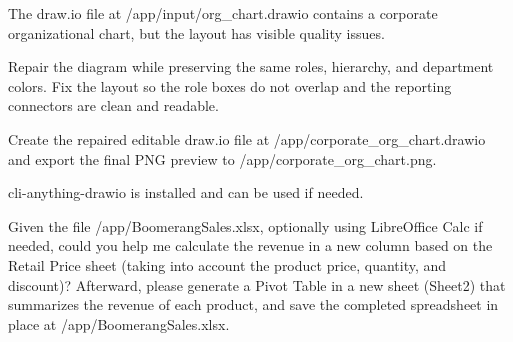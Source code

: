\begin{instructionbox}
The draw.io file at \textasciigrave{}/app/input/org\_chart.drawio\textasciigrave{} contains a corporate organizational chart, but the layout has visible quality issues.

Repair the diagram while preserving the same roles, hierarchy, and department colors. Fix the layout so the role boxes do not overlap and the reporting connectors are clean and readable.

Create the repaired editable draw.io file at \textasciigrave{}/app/corporate\_org\_chart.drawio\textasciigrave{} and export the final PNG preview to \textasciigrave{}/app/corporate\_org\_chart.png\textasciigrave{}.

\textasciigrave{}cli-anything-drawio\textasciigrave{} is installed and can be used if needed.
\end{instructionbox}

\begin{instructionbox}
Given the file \textasciigrave{}/app/BoomerangSales.xlsx\textasciigrave{}, optionally using LibreOffice Calc if needed, could you help me calculate the revenue in a new column based on the Retail Price sheet (taking into account the product price, quantity, and discount)? Afterward, please generate a Pivot Table in a new sheet (Sheet2) that summarizes the revenue of each product, and save the completed spreadsheet in place at \textasciigrave{}/app/BoomerangSales.xlsx\textasciigrave{}.
\end{instructionbox}

